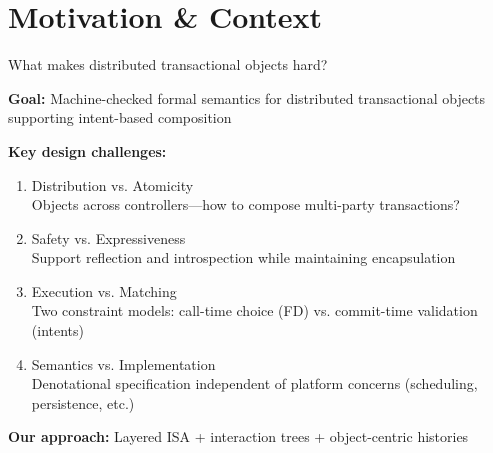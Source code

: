 \documentclass[handout,aspectratio=169,xcolor=dvipsnames,10pt]{beamer}
\begin{document}
\section{Motivation \& Context}


\begin{frame}{What makes distributed transactional objects hard?}

\vfill

\textbf{Goal:} Machine-checked formal semantics for distributed transactional objects supporting intent-based composition

\vspace{0.8em}

\textbf{Key design challenges:}

\begin{enumerate}
  \item \textcolor{nicered}{Distribution vs. Atomicity} \\
  {\small Objects across controllers—how to compose multi-party transactions?}

  \item \textcolor{nicered}{Safety vs. Expressiveness} \\
  {\small Support reflection and introspection while maintaining encapsulation}

  \item \textcolor{nicered}{Execution vs. Matching} \\
  {\small Two constraint models: call-time choice (FD) vs. commit-time validation (intents)}

  \item \textcolor{nicered}{Semantics vs. Implementation} \\
  {\small Denotational specification independent of platform concerns (scheduling, persistence, etc.)}
\end{enumerate}

\vspace{0.5em}

{\small\textbf{Our approach:} Layered ISA + interaction trees + object-centric histories}

\vfill

\end{frame}

\end{document}
